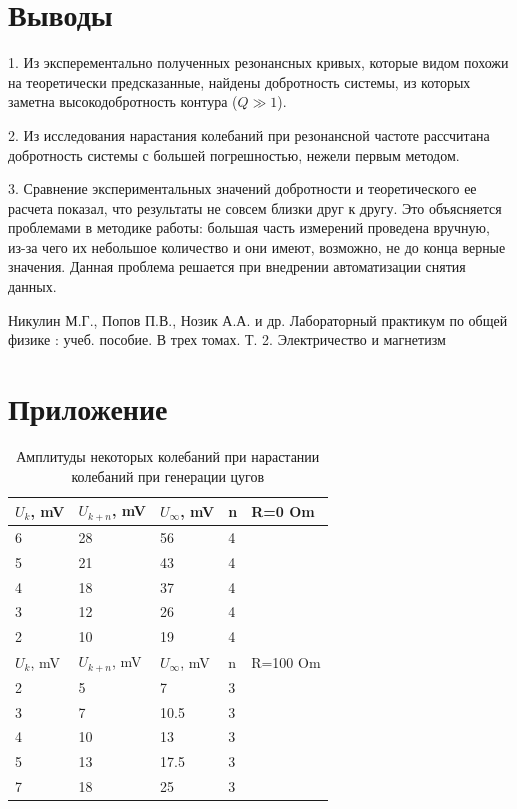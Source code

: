 \documentclass[a4paper,12pt]{article} %
\begin{document}
\section{Выводы}

\hspace{5mm}1. Из эксперементально полученных резонансных кривых, которые видом похожи на теоретически предсказанные, найдены добротность системы, из которых заметна высокодобротность контура ($Q\gg 1$).

2. Из исследования нарастания колебаний при резонансной частоте рассчитана добротность системы с большей погрешностью, нежели первым методом.

3. Сравнение экспериментальных значений добротности и теоретического ее расчета показал, что результаты не совсем близки друг к другу. Это объясняется проблемами в методике работы: большая часть измерений проведена вручную, из-за чего их небольшое количество и они имеют, возможно, не до конца верные значения. Данная проблема решается при внедрении автоматизации снятия данных.



\begin{thebibliography}{}
      Никулин М.Г., Попов П.В., Нозик А.А. и др. Лабораторный практикум по общей физике : учеб. пособие. В трех томах. Т. 2. Электричество и магнетизм
\end{thebibliography}


\section*{Приложение}
\begin{table}[h!]
\caption{Амплитуды некоторых колебаний при нарастании колебаний при генерации цугов}
\label{нарост}
\begin{tabular}{|l|l|l|l|l|}
\hline
$U_k$, mV & $U_{k+n}$, mV & $U_\infty$, mV & n & R=0 Om   \\ \hline
6         & 28            & 56             & 4 &          \\ \hline
5         & 21            & 43             & 4 &          \\ \hline
4         & 18            & 37             & 4 &          \\ \hline
3         & 12            & 26             & 4 &          \\ \hline
2         & 10            & 19             & 4 &          \\ \hline
$U_k$, mV & $U_{k+n}$, mV & $U_\infty$, mV & n & R=100 Om \\ \hline
2         & 5             & 7              & 3 &          \\ \hline
3         & 7             & 10.5           & 3 &          \\ \hline
4         & 10            & 13             & 3 &          \\ \hline
5         & 13            & 17.5           & 3 &          \\ \hline
7         & 18            & 25             & 3 &          \\ \hline
\end{tabular}
\end{table}
\end{document}
